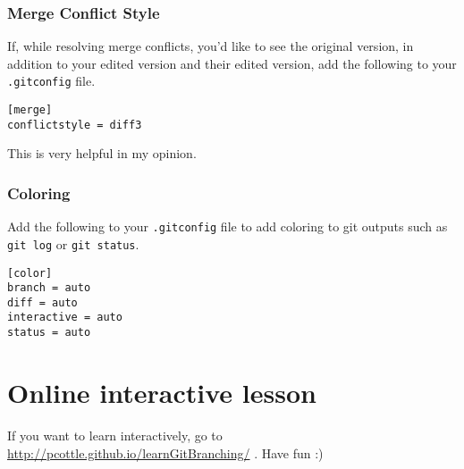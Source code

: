 \documentclass[12pt]{article}
\begin{document}
\subsubsection{Merge Conflict Style}
If, while resolving merge conflicts, you'd like to see the original version, in addition to your edited version and their edited version, add the following to your \texttt{.gitconfig} file.

\texttt{[merge]\\
conflictstyle = diff3 }

This is very helpful in my opinion.

\subsubsection{Coloring}
Add the following to your \texttt{.gitconfig} file to add coloring to git outputs such as \texttt{git log} or \texttt{git status}.

\texttt{[color]\\
  branch = auto\\
  diff = auto\\
  interactive = auto\\
  status = auto }

\section{Online interactive lesson}
If you want to learn interactively, go to \url{http://pcottle.github.io/learnGitBranching/} . Have fun :)
\end{document}
